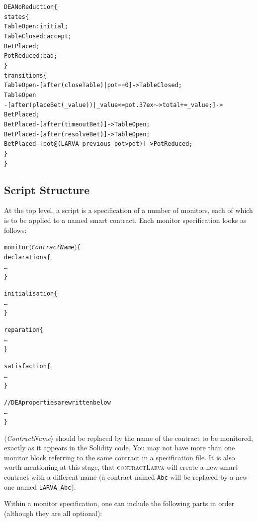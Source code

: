 \documentclass{article}
\newcommand{\contractlarva}{\textsc{contractLarva}\xspace}
\newcommand{\keyword}[1]{\textit{$\langle$#1$\rangle$}}
\newcommand{\tildearrow}{{\raise.37ex\hbox{$\scriptstyle\mathtt{\sim}$}}>\xspace}
\begin{document}
  \small\begin{alltt}
  DEA NoReduction \{
    states \{
      TableOpen: initial;
      TableClosed: accept;
      BetPlaced;
      PotReduced: bad;
    \}
    transitions \{
      TableOpen -[after(closeTable) | pot == 0 ]-> TableClosed;
      TableOpen 
        -[after(placeBet(\_value)) | \_value <= pot \tildearrow total += \_value;]-> 
          BetPlaced;
      BetPlaced -[after(timeoutBet)]-> TableOpen;
      BetPlaced -[after(resolveBet)]-> TableOpen;
      BetPlaced -[pot@(LARVA\_previous\_pot > pot)]-> PotReduced;
    \}
  \}
  \end{alltt}\normalsize
 

  \subsection{Script Structure}

  At the top level, a script is a specification of a number of monitors, each of which is to be applied to a named smart contract. Each monitor specification looks as follows:

  \small\begin{alltt}
  monitor \keyword{ContractName} \{
    declarations \{
      \ldots
    \}
    
    initialisation \{
      \ldots
    \}

    reparation \{
      \ldots
    \}

    satisfaction \{
      \ldots
    \}

    // DEA properties are written below
    \ldots
  \}
  \end{alltt}\normalsize
 
  \keyword{ContractName} should be replaced by the name of the contract to be monitored, exactly as it appears in the Solidity code. You may not have more than one monitor block referring to the same contract in a specification file. It is also worth mentioning at this stage, that \contractlarva will create a new smart contract with a different name (a contract named \texttt{Abc} will be replaced by a new one named \texttt{LARVA\_Abc}).
  
  Within a monitor specification, one can include the following parts in order (although they are all optional):
  
\end{document}
